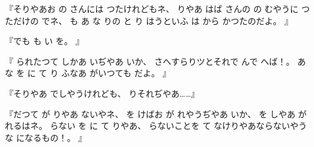 『そりやあお
の
さんには
つたけれどもネ、
りやあ
はば
さんの
の
むやうに
つただけの
でネ、
も
あ
な
りの
と
り
はうといふ
は
から
かつたのだよ。
』

『でも
も
い
を。
』

『
られたつて
しかあ
いぢやあ
いか、
さへすらりツとそれで
んで
へば！。
あ
な
を
に
て
り
ふなあ
がいつても
だよ。
』

『そりやあ
でしやうけれども、
りそれぢやあ……』

『だつて
が
りやあ
ないやネ、
を
けばお
が
れやうぢやあ
いか、
を
しやあ
が
れるはネ。
らない
を
に
て
りやあ、
らないことを
て
なけりやあならないやうな
になるもの！。
』

